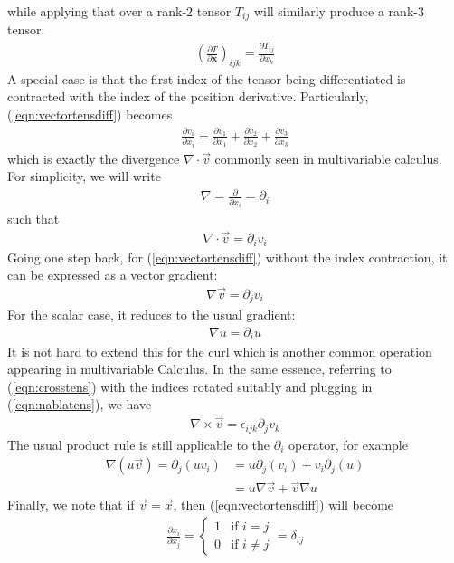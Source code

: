 while applying that over a rank-$2$ tensor $T_{ij}$ will similarly produce a rank-$3$ tensor:
\begin{align}
\left(\frac{\partial T}{\partial \textbf{x}}\right)_{ijk} = \frac{\partial T_{ij}}{\partial x_k}
\end{align}
A special case is that the first index of the tensor being differentiated is contracted with the index of the position derivative. Particularly, (\ref{eqn:vectortensdiff}) becomes
\begin{align}
\frac{\partial v_i}{\partial x_i} = \frac{\partial v_1}{\partial x_1} + \frac{\partial v_2}{\partial x_2} + \frac{\partial v_3}{\partial x_3}
\end{align}
which is exactly the divergence $\nabla \cdot \vec{v}$ commonly seen in multivariable calculus. For simplicity, we will write 
\begin{align}
\nabla = \frac{\partial}{\partial x_i} = \partial_i \label{eqn:nablatens}
\end{align}
such that
\begin{align}
\nabla \cdot \vec{v} = \partial_i v_i \label{eqn:divv}
\end{align}
Going one step back, for (\ref{eqn:vectortensdiff}) without the index contraction, it can be expressed as a vector gradient:
\begin{align}
\nabla \vec{v} = \partial_j v_i
\end{align}
For the scalar case, it reduces to the usual gradient:
\begin{align}
\nabla u = \partial_i u
\end{align}
It is not hard to extend this for the curl which is another common operation appearing in multivariable Calculus. In the same essence, referring to (\ref{eqn:crosstens}) with the indices rotated suitably and plugging in (\ref{eqn:nablatens}), we have
\begin{align}
\nabla \times \vec{v} = \epsilon_{ijk} \partial_j v_k \label{eqn:curltens}
\end{align}
The usual product rule is still applicable to the $\partial_i$ operator, for example
\begin{align*}
\nabla(u\vec{v}) = \partial_j(uv_i) &= u\partial_j(v_i) + v_i\partial_j(u) \\
&= u \nabla \vec{v} + \vec{v}\nabla u
\end{align*}
Finally, we note that if $\vec{v} = \vec{x}$, then (\ref{eqn:vectortensdiff}) will become
\begin{align}
\frac{\partial x_i}{\partial x_j} = \begin{cases}
1 & \text{if $i=j$} \\
0 & \text{if $i\neq j$}
\end{cases} = \delta_{ij}
\label{eqn:dxdxdelta}
\end{align}
